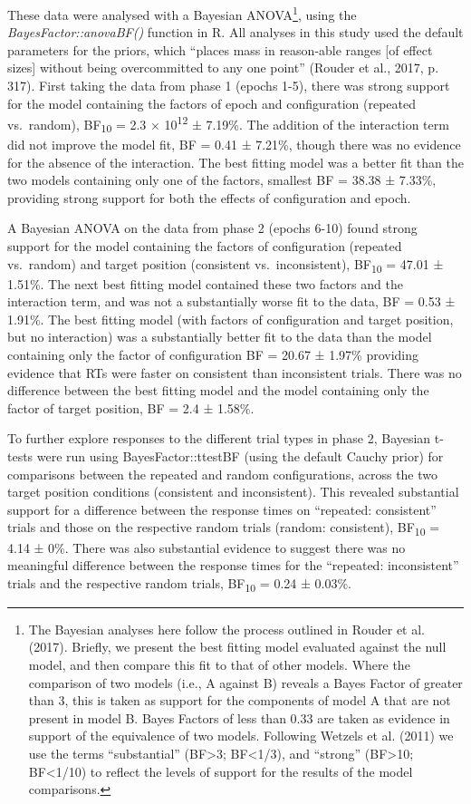 \documentclass[
  man,floatsintext]{apa7}
\begin{document}
These data were analysed with a Bayesian ANOVA\footnote{The Bayesian analyses here follow the process outlined in Rouder et al. (2017). Briefly, we present the best fitting model evaluated against the null model, and then compare this fit to that of other models. Where the comparison of two models (i.e., A against B) reveals a Bayes Factor of greater than 3, this is taken as support for the components of model A that are not present in model B. Bayes Factors of less than 0.33 are taken as evidence in support of the equivalence of two models. Following Wetzels et al. (2011) we use the terms ``substantial'' (BF\textgreater3; BF\textless1/3), and ``strong'' (BF\textgreater10; BF\textless1/10) to reflect the levels of support for the results of the model comparisons.}, using the \emph{BayesFactor::anovaBF()} function in R. All analyses in this study used the default parameters for the priors, which ``places mass in reason-able ranges {[}of effect sizes{]} without being overcommitted to any one point'' (Rouder et al., 2017, p. 317). First taking the data from phase 1 (epochs 1-5), there was strong support for the model containing the factors of epoch and configuration (repeated vs.~random), BF\textsubscript{10} = 2.3 × 10\textsuperscript{12} ± 7.19\%. The addition of the interaction term did not improve the model fit, BF = 0.41 ± 7.21\%, though there was no evidence for the absence of the interaction. The best fitting model was a better fit than the two models containing only one of the factors, smallest BF = 38.38 ± 7.33\%, providing strong support for both the effects of configuration and epoch.

A Bayesian ANOVA on the data from phase 2 (epochs 6-10) found strong support for the model containing the factors of configuration (repeated vs.~random) and target position (consistent vs.~inconsistent), BF\textsubscript{10} = 47.01 ± 1.51\%. The next best fitting model contained these two factors and the interaction term, and was not a substantially worse fit to the data, BF = 0.53 ± 1.91\%. The best fitting model (with factors of configuration and target position, but no interaction) was a substantially better fit to the data than the model containing only the factor of configuration BF = 20.67 ± 1.97\% providing evidence that RTs were faster on consistent than inconsistent trials. There was no difference between the best fitting model and the model containing only the factor of target position, BF = 2.4 ± 1.58\%.

To further explore responses to the different trial types in phase 2, Bayesian t-tests were run using BayesFactor::ttestBF (using the default Cauchy prior) for comparisons between the repeated and random configurations, across the two target position conditions (consistent and inconsistent). This revealed substantial support for a difference between the response times on ``repeated: consistent'' trials and those on the respective random trials (random: consistent), BF\textsubscript{10} = 4.14 ± 0\%. There was also substantial evidence to suggest there was no meaningful difference between the response times for the ``repeated: inconsistent'' trials and the respective random trials, BF\textsubscript{10} = 0.24 ± 0.03\%.
\end{document}
